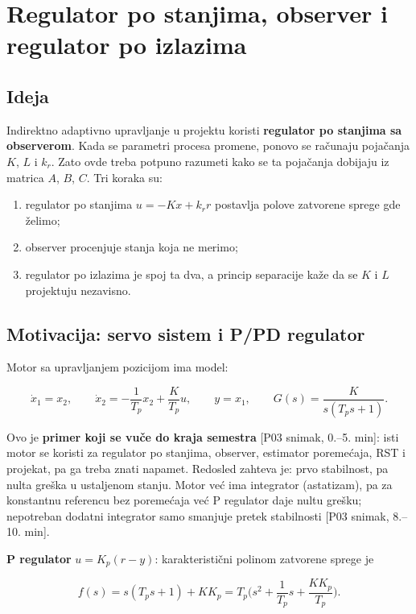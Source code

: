 \documentclass[11pt,a4paper,parskip=half,headsepline,numbers=noenddot]{scrartcl}
\DeclareRobustCommand{\izvor}[1]{{\small\color{izvorC}[#1]}}
\begin{document}
\section{Regulator po stanjima, observer i regulator po izlazima}

\subsection{Ideja}

Indirektno adaptivno upravljanje u projektu koristi \textbf{regulator po stanjima sa observerom}. Kada se parametri procesa promene, ponovo se računaju pojačanja \(K\), \(L\) i \(k_r\). Zato ovde treba potpuno razumeti kako se ta pojačanja dobijaju iz matrica \(A\), \(B\), \(C\). Tri koraka su:

\begin{enumerate}
\def\labelenumi{\arabic{enumi}.}
\item regulator po stanjima \(u = -Kx + k_r r\) postavlja polove zatvorene sprege gde želimo;
\item observer procenjuje stanja koja ne merimo;
\item regulator po izlazima je spoj ta dva, a princip separacije kaže da se \(K\) i \(L\) projektuju nezavisno.
\end{enumerate}

\subsection{Motivacija: servo sistem i P/PD regulator}

Motor sa upravljanjem pozicijom ima model:

\[\dot x_1 = x_2,\qquad \dot x_2 = -\frac{1}{T_p}x_2 + \frac{K}{T_p}u,\qquad y = x_1,\qquad G(s) = \frac{K}{s(T_ps+1)} .\]

Ovo je \textbf{primer koji se vuče do kraja semestra} \izvor{P03 snimak, 0.--5. min}: isti motor se koristi za regulator po stanjima, observer, estimator poremećaja, RST i projekat, pa ga treba znati napamet. Redosled zahteva je: prvo stabilnost, pa nulta greška u ustaljenom stanju. Motor već ima integrator (astatizam), pa za konstantnu referencu bez poremećaja već P regulator daje nultu grešku; nepotreban dodatni integrator samo smanjuje pretek stabilnosti \izvor{P03 snimak, 8.--10. min}.

\textbf{P regulator} \(u = K_p(r - y)\): karakteristični polinom zatvorene sprege je

\[f(s) = s(T_ps+1) + KK_p = T_p\Big(s^2 + \frac{1}{T_p}s + \frac{KK_p}{T_p}\Big).\]
\end{document}
